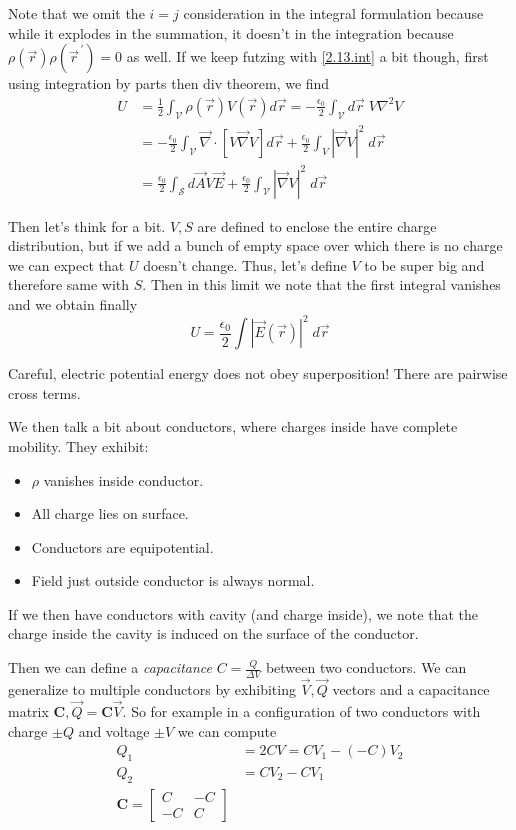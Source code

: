 \documentclass[10pt]{report}
\newcommand{\grad}[0]{\vec{\nabla}}
\renewcommand{\div}[0]{\vec{\nabla}\cdot}
\newcommand{\abs}[1]{\left|#1\right|}
\begin{document}
Note that we omit the $i=j$ consideration in the integral formulation because while it explodes in the summation, it doesn't in the integration because $\rho(\vec{r}) \rho(\vec{r}^{\,\prime}) = 0$ as well. If we keep futzing with \eqref{2.13.int} a bit though, first using integration by parts then div theorem, we find
\begin{align}
    U &= \frac{1}{2}\int_\mathcal{V}\rho(\vec{r})V(\vec{r})d\vec{r} = -\frac{\epsilon_0}{2}\int_\mathcal{V}d\vec{r}\; V\nabla^2V\\
    &= -\frac{\epsilon_0}{2}\int_\mathcal{V} \div \left[ V\grad V \right]d\vec{r} + \frac{\epsilon_0}{2}\int_V\abs{\grad V}^2\;d\vec{r}\\
    &= \frac{\epsilon_0}{2}\int_\mathcal{S} d\vec{A} V\vec{E} + \frac{\epsilon_0}{2}\int_\mathcal{V}\abs{\grad V}^2\;d\vec{r}
\end{align}

Then let's think for a bit. $V,S$ are defined to enclose the entire charge distribution, but if we add a bunch of empty space over which there is no charge we can expect that $U$ doesn't change. Thus, let's define $V$ to be super big and therefore same with $S$. Then in this limit we note that the first integral vanishes and we obtain finally
\begin{equation}
    U = \frac{\epsilon_0}{2}\int\abs{\vec{E}(\vec{r})}^2\; d\vec{r}
\end{equation}

Careful, electric potential energy does not obey superposition! There are pairwise cross terms. 

We then talk a bit about conductors, where charges inside have complete mobility. They exhibit:
\begin{itemize}
    \item $\rho$ vanishes inside conductor.
    \item All charge lies on surface.
    \item Conductors are equipotential.
    \item Field just outside conductor is always normal.
\end{itemize}

If we then have conductors with cavity (and charge inside), we note that the charge inside the cavity is induced on the surface of the conductor.

Then we can define a \emph{capacitance} $C = \frac{Q}{\Delta V}$ between two conductors. We can generalize to multiple conductors by exhibiting $\vec{V}, \vec{Q}$ vectors and a capacitance matrix $\mathbf{C}, \vec{Q} = \mathbf{C}\vec{V}$. So for example in a configuration of two conductors with charge $\pm Q$ and voltage $\pm V$ we can compute
\begin{align}
    Q_1 &= 2CV = CV_1 - (-C) V_2\\
    Q_2 &= CV_2 - C V_1\\
    \mathbf{C} = \begin{bmatrix} C & -C\\-C & C \end{bmatrix} 
\end{align}
\end{document}
